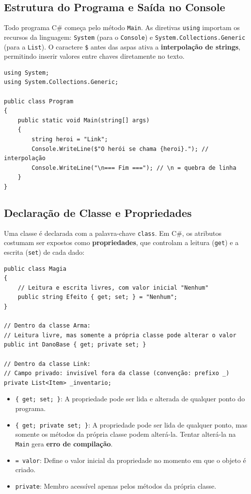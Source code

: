\subsection{Estrutura do Programa e Saída no Console}

Todo programa C\# começa pelo método \texttt{Main}. As diretivas \texttt{using} importam os
recursos da linguagem: \texttt{System} (para o \texttt{Console}) e
\texttt{System.Collections.Generic} (para a \texttt{List}). O caractere \texttt{\$} antes das
aspas ativa a \textbf{interpolação de strings}, permitindo inserir valores entre chaves
diretamente no texto.

\begin{lstlisting}[style=csharp]
using System;
using System.Collections.Generic;

public class Program
{
    public static void Main(string[] args)
    {
        string heroi = "Link";
        Console.WriteLine($"O herói se chama {heroi}."); // interpolação
        Console.WriteLine("\n=== Fim ==="); // \n = quebra de linha
    }
}
\end{lstlisting}

\subsection{Declaração de Classe e Propriedades}

Uma classe é declarada com a palavra-chave \texttt{class}. Em C\#, os atributos costumam ser
expostos como \textbf{propriedades}, que controlam a leitura (\texttt{get}) e a escrita
(\texttt{set}) de cada dado:

\begin{lstlisting}[style=csharp]
public class Magia
{
    // Leitura e escrita livres, com valor inicial "Nenhum"
    public string Efeito { get; set; } = "Nenhum";
}

// Dentro da classe Arma:
// Leitura livre, mas somente a própria classe pode alterar o valor
public int DanoBase { get; private set; }

// Dentro da classe Link:
// Campo privado: invisível fora da classe (convenção: prefixo _)
private List<Item> _inventario;
\end{lstlisting}

\begin{itemize}
    \item \texttt{\{ get; set; \}}: A propriedade pode ser lida e alterada de qualquer ponto
    do programa.

    \item \texttt{\{ get; private set; \}}: A propriedade pode ser lida de qualquer ponto, mas
    somente os métodos da própria classe podem alterá-la. Tentar alterá-la na \texttt{Main}
    gera \textbf{erro de compilação}.

    \item \texttt{= valor}: Define o valor inicial da propriedade no momento em que o objeto
    é criado.

    \item \texttt{private}: Membro acessível apenas pelos métodos da própria classe.
\end{itemize}


